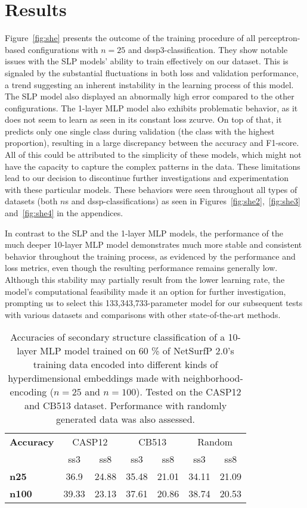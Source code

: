 \section{Results}
Figure~\ref{fig:she} presents the outcome of the training procedure of all perceptron-based configurations with $n=25$ and dssp3-classification. They show notable issues with the SLP models' ability to train effectively on our dataset. This is signaled by the substantial fluctuations in both loss and validation performance, a trend suggesting an inherent instability in the learning process of this model. The SLP model also displayed an abnormally high error compared to the other configurations. The 1-layer MLP model also exhibits problematic behavior, as it does not seem to learn as seen in its constant loss zcurve. On top of that, it predicts only one single class during validation (the class with the highest proportion), resulting in a large discrepancy between the accuracy and F1-score. All of this could be attributed to the simplicity of these models, which might not have the capacity to capture the complex patterns in the data. These limitations lead to our decision to discontinue further investigations and experimentation with these particular models. These behaviors were seen throughout all types of datasets (both $n$s and dssp-classifications) as seen in Figures~\ref{fig:she2},~\ref{fig:she3} and~\ref{fig:she4} in the appendices.  

In contrast to the SLP and the 1-layer MLP models, the performance of the much deeper 10-layer MLP model demonstrates much more stable and consistent behavior throughout the training process, as evidenced by the performance and loss metrics, even though the resulting performance remains generally low. Although this stability may partially result from the lower learning rate, the model's computational feasibility made it an option for further investigation, prompting us to select this 133,343,733-parameter model for our subsequent tests with various datasets and comparisons with other state-of-the-art methods.

\begin{table}[h]
    \caption{Accuracies of secondary structure classification of a 10-layer MLP model trained on 60 \% of NetSurfP 2.0's training data encoded into different kinds of hyperdimensional embeddings made with neighborhood-encoding ($n = 25$ and $n=100$). Tested on the CASP12 and CB513 dataset. Performance with randomly generated data was also assessed.}
    \label{tab:casp}
    \centering
    \begin{tabular}{l|cc|cc|cc}
        \toprule
        \textbf{Accuracy} & \multicolumn{2}{c|}{CASP12} & \multicolumn{2}{c|}{CB513} & \multicolumn{2}{c|}{Random}\\
        & ss3 & ss8 & ss3 & ss8 & ss3 & ss8\\
        \midrule
        \textbf{n25} & 36.9 & 24.88 & 35.48 & 21.01 & 34.11 & 21.09 \\
        \textbf{n100} & 39.33 & 23.13 & 37.61 & 20.86 & 38.74 & 20.53\\
        \bottomrule
    \end{tabular}
\end{table}

